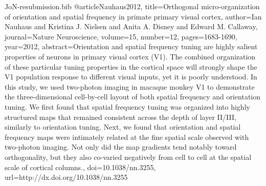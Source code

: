 \documentclass{article}
\begin{document}
\begin{filecontents}{JoN-resubmission.bib}
@article{Nauhaus2012,
  title={Orthogonal micro-organization of orientation and spatial frequency in primate primary visual cortex},
  author={Ian Nauhaus and Kristina J. Nielsen and Anita A. Disney and Edward M. Callaway},
  journal={Nature Neuroscience},
  volume={15},
  number={12},
  pages={1683-1690},
  year={2012},
  abstract={Orientation and spatial frequency tuning are highly
                  salient properties of neurons in primary visual
                  cortex (V1). The combined organization of these
                  particular tuning properties in the cortical space
                  will strongly shape the V1 population response to
                  different visual inputs, yet it is poorly
                  understood. In this study, we used two-photon
                  imaging in macaque monkey V1 to demonstrate the
                  three-dimensional cell-by-cell layout of both
                  spatial frequency and orientation tuning. We first
                  found that spatial frequency tuning was organized
                  into highly structured maps that remained consistent
                  across the depth of layer II/III, similarly to
                  orientation tuning. Next, we found that orientation
                  and spatial frequency maps were intimately related
                  at the fine spatial scale observed with two-photon
                  imaging. Not only did the map gradients tend notably
                  toward orthogonality, but they also co-varied
                  negatively from cell to cell at the spatial scale of
                  cortical columns.},
  doi={10.1038/nn.3255},
  url={http://dx.doi.org/10.1038/nn.3255}
}


\end{filecontents}
\end{document}
